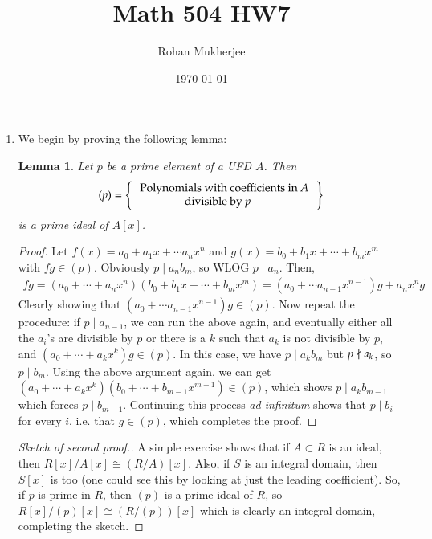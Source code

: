 \documentclass[12pt]{article}
\title{Math 504 HW7}
\date{\today}
\author{Rohan Mukherjee}
\newtheorem{lemma}{Lemma}
\theoremstyle{definitionstyle}
\begin{document}
	\maketitle
	\begin{enumerate}[leftmargin=\labelsep]
		\item We begin by proving the following lemma:
		
		\begin{lemma}
			Let $p$ be a prime element of a UFD $A$. Then 
			\begin{align*}
				(p) = \Set{\begin{array}{l}
						\text{Polynomials with coefficients in $A$}  \\ \quad \quad \quad \quad \text{divisible by $p$}
					\end{array}}
			\end{align*}
			is a prime ideal of $A[x]$. 
		\end{lemma}
		\begin{proof}
			Let $f(x) = a_0 + a_1x + \cdots a_nx^n$ and $g(x) = b_0 + b_1x + \cdots + b_mx^m$ with $fg \in (p)$. Obviously $p \mid a_nb_m$, so WLOG $p \mid a_n$. Then,
			\begin{align*}
				fg = (a_0 + \cdots + a_nx^n)(b_0 + b_1x + \cdots + b_mx^m) = (a_0 + \cdots a_{n-1}x^{n-1})g + a_nx^ng
			\end{align*}
			Clearly showing that $(a_0 + \cdots a_{n-1}x^{n-1})g \in (p)$. Now repeat the procedure: if $p \mid a_{n-1}$, we can run the above again, and eventually either all the $a_i$'s are divisible by $p$ or there is a $k$ such that $a_k$ is not divisible by $p$, and $(a_0 + \cdots + a_kx^k)g \in (p)$. In this case, we have $p \mid a_kb_m$ but $p \not \mid a_k$, so $p \mid b_m$. Using the above argument again, we can get $(a_0 + \cdots + a_kx^k)(b_0 + \cdots + b_{m-1}x^{m-1}) \in (p)$, which shows $p \mid a_kb_{m-1}$ which forces $p \mid b_{m-1}$. Continuing this process \textit{ad infinitum} shows that $p \mid b_i$ for every $i$, i.e. that $g \in (p)$, which completes the proof.
		\end{proof}
		
		\begin{proof}[Sketch of second proof.]
			A simple exercise shows that if $A \subset R$ is an ideal, then $R[x]/A[x] \cong (R/A)[x]$. Also, if $S$ is an integral domain, then $S[x]$ is too (one could see this by looking at just the leading coefficient). So, if $p$ is prime in $R$, then $(p)$ is a prime ideal of $R$, so $R[x]/(p)[x] \cong (R/(p))[x]$ which is clearly an integral domain, completing the sketch.
		\end{proof}
	

\end{enumerate}
\end{document}
